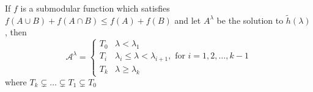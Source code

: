 \begin{proposition}\label{prop:struc}
If $f$ is a submodular function which satisfies $f(A\cup B) + f(A\cap B) \leq f(A) + f(B)$ and 
let $A^{\lambda}$ be the solution to $\tilde{h}(\lambda)$, then 
\begin{equation}\label{eq:Alambda}
\mathcal{A}^{\lambda}=\begin{cases}
T_0 & \lambda < \lambda_1 \\
T_i & \lambda_i \leq \lambda < \lambda_{i+1}, \textrm{ for } i=1, 2, \dots, k-1 \\
T_k & \lambda \geq \lambda_{k}
\end{cases}
\end{equation}
where $T_k \subsetneq  \dots \subsetneq T_1 \subsetneq T_0$
\end{proposition}